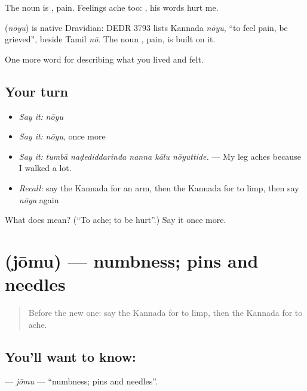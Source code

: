 The noun is , pain. Feelings ache too:    , his words hurt me.

\begin{cousinweb}
\textbf{} (\emph{nōyu}) is native Dravidian: DEDR 3793 lists Kannada \emph{nōyu}, \textquotedblleft{}to feel pain, be grieved\textquotedblright{}, beside Tamil \emph{nō}. The noun , pain, is built on it.
\end{cousinweb}

\begin{grammarlens}[title={What you've built}]
One more word for describing what you lived and felt.
\end{grammarlens}

\subsection*{Your turn}
\begin{itemize}
\raggedright
  \item \emph{Say it:} \emph{nōyu}
  \item \emph{Say it:} \emph{nōyu}, once more
  \item \emph{Say it:} \emph{tumbā naḍediddarinda nanna kālu nōyuttide.} — My leg aches because I walked a lot.
  \item \emph{Recall:} say the Kannada for an arm, then the Kannada for to limp, then say \emph{nōyu} again
\end{itemize}

\begin{tcolorbox}[breakable,colback=teal!4,colframe=teal!35!black,title={Before you move on}]
What does  mean? (\textquotedblleft{}To ache; to be hurt\textquotedblright{}.) Say it once more.
\end{tcolorbox}
\section[\texorpdfstring{\kn{ಜೋಮು} (jōmu)}{ಜೋಮು (jōmu)}]{ (jōmu) — numbness; pins and needles}

\label{lesson:KA-C510-jomu}



\begin{quote}
Before the new one: say the Kannada for to limp, then the Kannada for to ache.
\end{quote}

\subsection*{You'll want to know: }
\textbf{} — \emph{jōmu} — \textquotedblleft{}numbness; pins and needles\textquotedblright{}.

